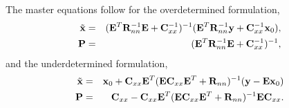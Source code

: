 \documentclass{article}
\begin{document}
The master equations follow for the overdetermined formulation,
\begin{eqnarray}
  \label{eq:master5}
{\tilde {\bf x}} &=& ({\bf E}^T {\bf R}_{nn}^{-1} {\bf E} + {\bf C}^{-1}_{xx})^{-1} ({\bf E}^T {\bf R}_{nn}^{-1} {\bf y} + {\bf C}_{xx}^{-1} {\bf x}_0), \\
\label{eq:master6}
{\bf P} &=& ({\bf E}^T {\bf R}_{nn}^{-1} {\bf E} + {\bf C}_{xx}^{-1})^{-1},
\end{eqnarray}
and the underdetermined formulation,
\begin{eqnarray}
  \label{eq:master7}
{\tilde {\bf x}} &=& {\bf x}_0 + {\bf C}_{xx} {\bf E}^T ({\bf EC}_{xx} {\bf E}^T + {\bf R}_{nn})^{-1} ({\bf y}-{\bf Ex}_0) \\
\label{eq:master8}
\bf{P} &=& {\bf C}_{xx} - {\bf C}_{xx} {\bf E}^T ({\bf EC}_{xx} {\bf E}^T + {\bf R}_{nn})^{-1} {\bf EC}_{xx}.
\end{eqnarray}
\end{document}
